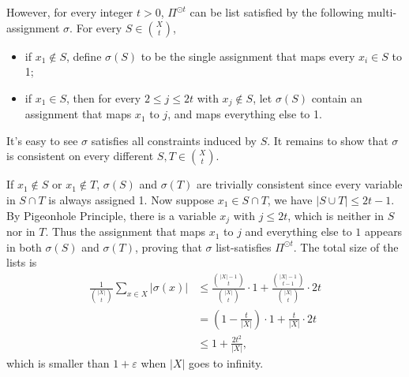     However, for every integer $t>0$, $\Pi^{\odot t}$ can be list satisfied by the following multi-assignment $\sigma$. For every $S \in \binom{X}{t}$, 
    \begin{itemize}
        \item if $x_1 \notin S$, define $\sigma(S)$ to be the single assignment that maps every $x_i \in S$ to 1;
        \item if $x_1 \in S$, then for every $2 \le j \le 2t$ with $x_j \notin S$, let $\sigma(S)$ contain an assignment that maps $x_1$ to $j$, and maps everything else to 1.
    \end{itemize}
    
    It's easy to see $\sigma$ satisfies all constraints induced by $S$. It remains to show that $\sigma$ is consistent on every different $S,T \in \binom{X}{t}$. 
    
    If $x_1 \notin S$ or $x_1 \notin T$, $\sigma(S)$ and $\sigma(T)$ are trivially consistent since every variable in $S \cap T$ is always assigned 1. Now suppose $x_1 \in S\cap T$, we have $|S \cup T| \le 2t-1$. By Pigeonhole Principle, there is a variable $x_j$ with $j \le 2t$, which is neither in $S$ nor in $T$. Thus the assignment that maps $x_1$ to $j$ and everything else to $1$ appears in both $\sigma(S)$ and $\sigma(T)$, proving that $\sigma$ list-satisfies $\Pi^{\odot t}$. The total size of the lists is \[
    \begin{aligned}
        \frac{1}{\binom{|X|}{t}}\sum_{x \in X} |\sigma(x)| & \le \frac{\binom{|X|-1}{t}}{\binom{|X|}{t}}\cdot 1+\frac{\binom{|X|-1}{t-1}}{\binom{|X|}{t}}\cdot 2t \\ 
        & = \left(1-\frac{t}{|X|}\right)\cdot 1+\frac{t}{|X|}\cdot 2t \\
        & \le 1+\frac{2t^2}{|X|},
    \end{aligned}\]
    which is smaller than $1+\varepsilon$ when $|X|$ goes to infinity.
    

